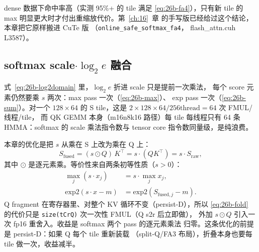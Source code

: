 dense 数据下命中率高（实测 95\%+ 的 tile 满足
\eqref{eq:26b-fa4}），只有新 tile 的 max 明显更大时才付出重缩放代价。第~\ref{ch:16}~章
的手写版已经给过这个结论，本章把它原样搬进 CuTe 版
（\texttt{online\_\allowbreak{}safe\_\allowbreak{}softmax\_\allowbreak{}fa4}，
flash\_attn.cuh L3587）。

\subsection{softmax scale$\cdot\log_2 e$ 融合}\label{sec:26b-scale-math}

式~\eqref{eq:26b-log2domain} 里，$\log_2 e$ 折进 scale 只是提前一次乘法，
每个 score 元素仍然要乘 $s$ 两次：max pass 一次（\eqref{eq:26b-max}）、
exp pass 一次（\eqref{eq:26b-sum}）。对一个 $128\times 64$ 的 S tile，这是
$2\times 128\times 64 / 256\text{thread} = 64$ 次 FMUL/线程/tile，
而 QK GEMM 本身（m16n8k16 路径）每 tile 每线程只有 64 条 HMMA：softmax 的
scale 乘法指令数与 tensor core 指令数同量级，是纯浪费。

本章的优化是把 $s$ 从乘在 S 上改为乘在 Q 上：
\begin{equation}\label{eq:26b-fold}
  S_{\text{fused}} = (s\odot Q)\,K^\top = s\cdot(QK^\top) = s\cdot S_{\text{raw}},
\end{equation}
其中 $\odot$ 是逐元素乘。等价性来自两条初等性质（$s>0$）：
\begin{align}
  \max_j (s\cdot x_j) &= s\cdot \max_j x_j, \label{eq:26b-maxcommute}\\
  \mathrm{exp2}(s\cdot x - m) &= \mathrm{exp2}(S_{\text{fused},j} - m). \label{eq:26b-expcommute}
\end{align}
Q fragment 在寄存器里、对整个 KV 循环不变（persist-D），所以
\eqref{eq:26b-fold} 的代价只是 \texttt{size(tCrQ)} 次一次性 FMUL（Q s2r 后立即做），
外加 $s\odot Q$ 引入一次 fp16 重舍入。收益是 softmax 两个 pass 的逐元素乘法
归零。这条优化的前提是 persist-D：如果 Q 每个 tile 重新装载
（split-Q/FA3 布局），折叠本身也要每 tile 做一次，收益减半。

